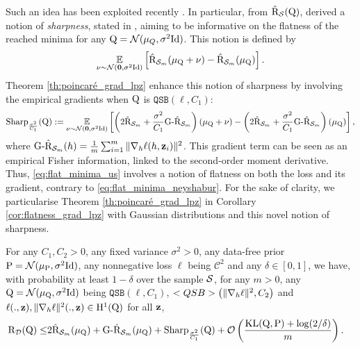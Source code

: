 Such an idea has been exploited recently \citep{neyshabur2017explor,jiang2020fantastic,dziugaite2020search}.
In particular, from $\hat{\Risk}_\S(\Q)$, \citet{neyshabur2017explor} derived a notion of \emph{sharpness}, stated in , aiming to be informative on the flatness of the reached minima for any $\Q= \Ncal(\mu_Q,\sigma^2 \mathrm{Id})$.
This notion is defined by 
\begin{equation}
  \label{eq:flat_minima_neyshabur}
  \EE_{\nu\sim \Ncal(\mathbf{0},\sigma^2 \mathrm{Id})} \LB \hat{\Risk}_{\S_m}(\mu_\Q + \nu) -  \hat{\Risk}_{\S_m}(\mu_\Q) \RB.
\end{equation}
Theorem \ref{th:poincaré_grad_lpz} enhance this notion of sharpness by involving the empirical gradients when $\Q$ is $\texttt{QSB}(\ell,C_1)$: 
\begin{equation}
  \label{eq:flat_minima_us}
  \textrm{Sharp}_{\frac{\sigma^2}{C_1}}(\Q):= \EE_{\nu\sim \Ncal(\mathbf{0},\sigma^2 \mathrm{Id})} \LB \LP2\hat{\Risk}_{\S_m} + \frac{\sigma^2}{C_1}\textrm{G-}\hat{\Risk}_{\S_m}\RP(\mu_\Q + \nu)  -  \LP2\hat{\Risk}_{\S_m} + \frac{\sigma^2}{C_1}\textrm{G-}\hat{\Risk}_{\S_m}\RP(\mu_\Q) \RB ,
\end{equation}
where $\textrm{G-}\hat{\Risk}_{\S_m}(h) = \frac{1}{m}\sum_{i=1}^m\|\nabla_h \ell(h, \z_i)\|^2$.
This gradient term can be seen as an empirical Fisher information, linked to the second-order moment derivative.
Thus, \eqref{eq:flat_minima_us} involves a notion of flatness on both the loss and its gradient, contrary to \eqref{eq:flat_minima_neyshabur}.
For the sake of clarity, we particularise Theorem \ref{th:poincaré_grad_lpz} in Corollary \ref{cor:flatness_grad_lpz} with Gaussian distributions and this novel notion of sharpness.
\begin{corollary}\label{cor:flatness_grad_lpz}
For any $C_1,C_2>0$, any fixed variance $\sigma^2>0$, any data-free prior $\P=\Ncal(\mu_\P,\sigma^2 \mathrm{Id})$, any nonnegative loss $\ell$ being $\mathcal{C}^2$ and any $\delta\in [0,1]$, we have, with probability at least $1-\delta$ over the sample $\S$, for any $m>0$, any $\Q= \mathcal{N}(\mu_\Q,\sigma^2 \mathrm{Id})$ being $\texttt{QSB}(\ell,C_1)$, $\texttt{QSB}\LP\|\nabla_h \ell\|^2,C_2\RP$ and $\ell(.,\z),\|\nabla_h \ell\|^2(.,\z)\in \mathrm{H}^{1}(\Q)$ for all $\z$, 
\begin{align*}
\Risk_{\D}(\Q) \leq & 2 \hat{\Risk}_{\S_m}(\mu_\Q) + \textrm{G-}\hat{\Risk}_{\S_m}(\mu_\Q) + \textrm{Sharp}_{\frac{\sigma^2}{C_1}}(\Q) + \mathcal{O}\LP\frac{\KL(\Q,\P) +\log(2/\delta)}{ m}\RP.
\end{align*}
\end{corollary}
  

